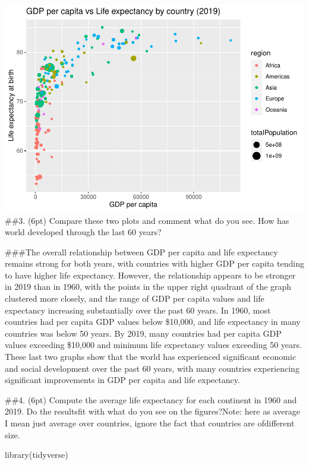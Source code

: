 \documentclass[
]{article}
\newenvironment{Shaded}{\begin{snugshade}}{\end{snugshade}}
\newcommand{\FunctionTok}[1]{\textcolor[rgb]{0.00,0.00,0.00}{#1}}
\newcommand{\NormalTok}[1]{#1}
\begin{document}
\includegraphics{ps05-rmarkdown_files/figure-latex/unnamed-chunk-15-1.pdf}
\#\#3. (6pt) Compare these two plots and comment what do you see. How
has world developed through the last 60 years?

\#\#\#The overall relationship between GDP per capita and life
expectancy remains strong for both years, with countries with higher GDP
per capita tending to have higher life expectancy. However, the
relationship appears to be stronger in 2019 than in 1960, with the
points in the upper right quadrant of the graph clustered more closely,
and the range of GDP per capita values and life expectancy increasing
substantially over the past 60 years. In 1960, most countries had per
capita GDP values below \$10,000, and life expectancy in many countries
was below 50 years. By 2019, many countries had per capita GDP values
exceeding \$10,000 and minimum life expectancy values exceeding 50
years. These last two graphs show that the world has experienced
significant economic and social development over the past 60 years, with
many countries experiencing significant improvements in GDP per capita
and life expectancy.

\#\#4. (6pt) Compute the average life expectancy for each continent in
1960 and 2019. Do the resultsfit with what do you see on the
figures?Note: here as average I mean just average over countries, ignore
the fact that countries are ofdifferent size.

\begin{Shaded}
\begin{Highlighting}[]
\FunctionTok{library}\NormalTok{(tidyverse)}
\end{Highlighting}
\end{Shaded}
\end{document}
